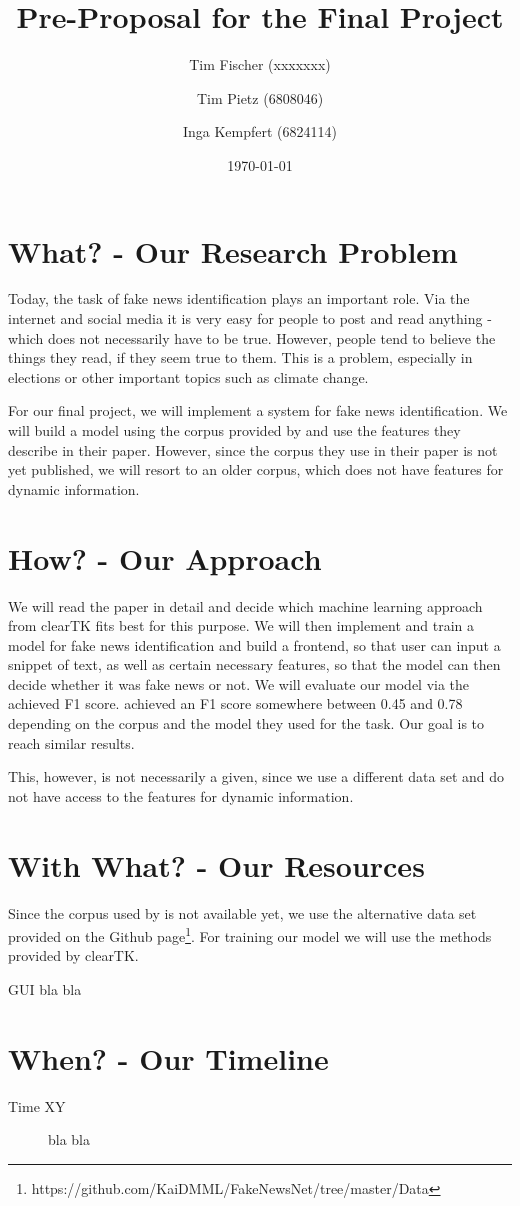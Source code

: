 \documentclass{article}
\title{Pre-Proposal for the Final Project}
\date{\today}
\author{Tim Fischer (xxxxxxx) \and Tim Pietz (6808046) \and Inga Kempfert (6824114)}
\begin{document}
\maketitle

\section{What? - Our Research Problem}
Today, the task of fake news identification plays an important role. Via the internet and social media it is very easy for people to post and read anything - which does not necessarily have to be true. However, people tend to believe the things they read, if they seem true to them. This is a problem, especially in elections \parencite{shu2018fakenewsnet} or other important topics such as climate change.

For our final project, we will implement a system for fake news identification. We will build a model using the corpus provided by \textcite{shu2018fakenewsnet} and use the features they describe in their paper. However, since the corpus they use in their paper is not yet published, we will resort to an older corpus, which does not have features for dynamic information.

\section{How? -  Our Approach}
We will read the paper in detail and decide which machine learning approach from clearTK fits best for this purpose. We will then implement and train a model for fake news identification and build a frontend, so that user can input a snippet of text, as well as certain necessary features, so that the model can then decide whether it was fake news or not.
We will evaluate our model via the achieved F1 score. \textcite{shu2018fakenewsnet} achieved an F1 score somewhere between 0.45 and 0.78 depending on the corpus and the model they used for the task. Our goal is to reach similar results.

This, however, is not necessarily a given, since we use a different data set and do not have access to the features for dynamic information.

\section{With What? - Our Resources}
Since the corpus used by \textcite{shu2018fakenewsnet} is not available yet, we use the alternative data set provided on the Github page\footnote{https://github.com/KaiDMML/FakeNewsNet/tree/master/Data}.
For training our model we will use the methods provided by clearTK.

GUI bla bla

\section{When? - Our Timeline}
\begin{description}
	\item[Time XY] bla bla
\end{description}

\printbibliography
\end{document}
